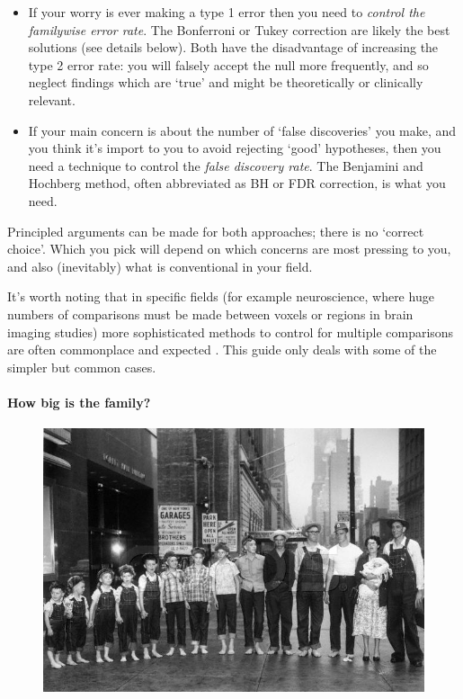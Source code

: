 \documentclass[]{article}
\let\oldparagraph\paragraph
\renewcommand{\paragraph}[1]{\oldparagraph{#1}\mbox{}}
\theoremstyle{definition}
\theoremstyle{definition}
\theoremstyle{definition}
\theoremstyle{remark}
\begin{document}
\begin{itemize}
\item
  If your worry is ever making a type 1 error then you need to
  \emph{control the familywise error rate}. The Bonferroni or Tukey
  correction are likely the best solutions (see details below). Both
  have the disadvantage of increasing the type 2 error rate: you will
  falsely accept the null more frequently, and so neglect findings which
  are `true' and might be theoretically or clinically relevant.
\item
  If your main concern is about the number of `false discoveries' you
  make, and you think it's import to you to avoid rejecting `good'
  hypotheses, then you need a technique to control the \emph{false
  discovery rate}. The Benjamini and Hochberg method, often abbreviated
  as BH or FDR correction, is what you need.
\end{itemize}

Principled arguments can be made for both approaches; there is no
`correct choice'. Which you pick will depend on which concerns are most
pressing to you, and also (inevitably) what is conventional in your
field.

{It's worth noting that in specific fields (for example neuroscience,
where huge numbers of comparisons must be made between voxels or regions
in brain imaging studies) more sophisticated methods to control for
multiple comparisons are often commonplace and expected
\citep{nichols2003controlling}. This guide only deals with some of the
simpler but common cases.}

\paragraph{How big is the family?}\label{how-big-is-the-family}

\begin{figure}
\centering
\includegraphics{media/large-family.jpg}
\caption{}
\end{figure}
\end{document}
